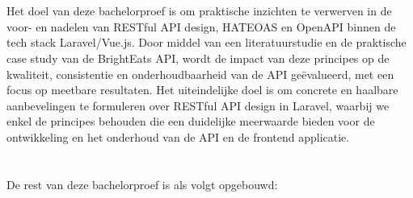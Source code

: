 \section{}%
\label{sec:onderzoeksdoelstelling}

Het doel van deze bachelorproef is om praktische inzichten te verwerven in de voor- en nadelen van RESTful API design, HATEOAS en OpenAPI binnen de tech stack Laravel/Vue.js. Door middel van een literatuurstudie en de praktische case study van de BrightEats API, wordt de impact van deze principes op de kwaliteit, consistentie en onderhoudbaarheid van de API geëvalueerd, met een focus op meetbare resultaten. Het uiteindelijke doel is om concrete en haalbare aanbevelingen te formuleren over RESTful API design in Laravel, waarbij we enkel de principes behouden die een duidelijke meerwaarde bieden voor de ontwikkeling en het onderhoud van de API en de frontend applicatie.

\section{}%
\label{sec:opzet-bachelorproef}


De rest van deze bachelorproef is als volgt opgebouwd:

